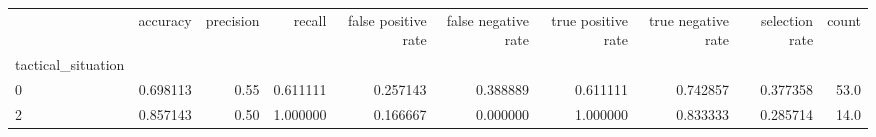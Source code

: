 \begin{tabular}{lrrrrrrrrr}
\toprule
{} &  accuracy &  precision &    recall &  false positive rate &  false negative rate &  true positive rate &  true negative rate &  selection rate &  count \\
tactical\_situation &           &            &           &                      &                      &                     &                     &                 &        \\
\midrule
0                  &  0.698113 &       0.55 &  0.611111 &             0.257143 &             0.388889 &            0.611111 &            0.742857 &        0.377358 &   53.0 \\
2                  &  0.857143 &       0.50 &  1.000000 &             0.166667 &             0.000000 &            1.000000 &            0.833333 &        0.285714 &   14.0 \\
\bottomrule
\end{tabular}
